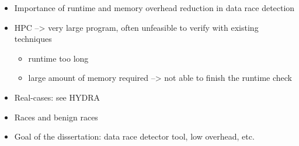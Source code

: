 \begin{itemize}
  \item Importance of runtime and memory overhead reduction in data race
    detection
  \item HPC --> very large program, often unfeasible to verify with
    existing techniques
    \begin{itemize}
    \item runtime too long
    \item large amount of memory required --> not able to finish the
      runtime check
    \end{itemize}
  \item Real-cases: see HYDRA
  \item Races and benign races
  \item Goal of the dissertation: data race detector tool, low overhead, etc.
\end{itemize}

